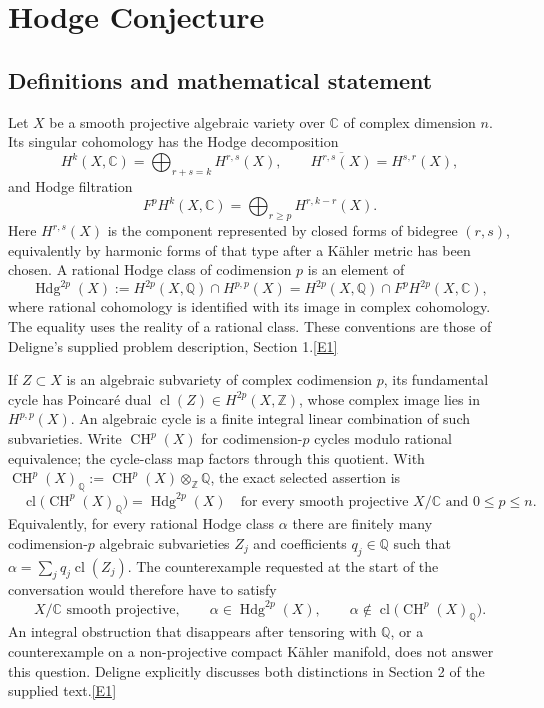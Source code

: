 \documentclass[11pt]{article}
\newcommand{\Q}{\mathbb Q}
\newcommand{\Z}{\mathbb Z}
\newcommand{\C}{\mathbb C}
\newcommand{\cl}{\operatorname{cl}}
\newcommand{\CH}{\operatorname{CH}}
\newcommand{\src}[1]{\hyperlink{src:#1}{[#1]}}
\begin{document}
\section*{\texorpdfstring{Hodge Conjecture}{Hodge Conjecture}}\label{hodge}\label{6}
\subsection{Definitions and mathematical statement}
Let $X$ be a smooth projective algebraic variety over $\C$ of complex dimension
$n$. Its singular cohomology has the Hodge decomposition
\[
 H^k(X,\C)=\bigoplus_{r+s=k}H^{r,s}(X),\qquad
 \overline{H^{r,s}(X)}=H^{s,r}(X),
\]
and Hodge filtration
\[
 F^pH^k(X,\C)=\bigoplus_{r\ge p}H^{r,k-r}(X).
\]
Here $H^{r,s}(X)$ is the component represented by closed forms of bidegree
$(r,s)$, equivalently by harmonic forms of that type after a K\"ahler metric
has been chosen. A rational Hodge class of codimension $p$ is an element of
\[
 \operatorname{Hdg}^{2p}(X)
 :=H^{2p}(X,\Q)\cap H^{p,p}(X)
 =H^{2p}(X,\Q)\cap F^pH^{2p}(X,\C),
\]
where rational cohomology is identified with its image in complex cohomology.
The equality uses the reality of a rational class. These conventions are those
of Deligne's supplied problem description, Section 1.\src{E1}

If $Z\subset X$ is an algebraic subvariety of complex codimension $p$, its
fundamental cycle has Poincar\'e dual
$\cl(Z)\in H^{2p}(X,\Z)$, whose complex image lies in $H^{p,p}(X)$.
An algebraic cycle is a finite integral linear combination of such
subvarieties. Write $\CH^p(X)$ for codimension-$p$ cycles modulo rational
equivalence; the cycle-class map factors through this quotient. With
$\CH^p(X)_{\Q}:=\CH^p(X)\otimes_{\Z}\Q$, the exact selected assertion is
\begin{equation}\label{hodge:statement}
 \boxed{\quad
 \cl\bigl(\CH^p(X)_{\Q}\bigr)=\operatorname{Hdg}^{2p}(X)
 \quad\text{for every smooth projective }X/\C\text{ and }0\le p\le n.
 \quad}
\end{equation}
Equivalently, for every rational Hodge class $\alpha$ there are finitely many
codimension-$p$ algebraic subvarieties $Z_j$ and coefficients $q_j\in\Q$ such
that $\alpha=\sum_jq_j\cl(Z_j)$. The counterexample requested at the start of
the conversation would therefore have to satisfy
\begin{equation}\label{hodge:counterexample}
 X/\C\text{ smooth projective},\qquad
 \alpha\in\operatorname{Hdg}^{2p}(X),\qquad
 \alpha\notin\cl\bigl(\CH^p(X)_{\Q}\bigr).
\end{equation}
An integral obstruction that disappears after tensoring with $\Q$, or a
counterexample on a non-projective compact K\"ahler manifold, does not answer
this question. Deligne explicitly discusses both distinctions in Section 2
of the supplied text.\src{E1}
\end{document}
